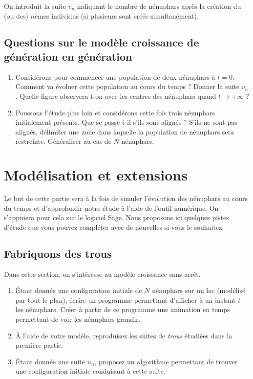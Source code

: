 \documentclass{../ficheTDTP}
\begin{document}
	On introduit la suite $v_n$ indiquant le nombre de nénuphars après la création du (ou des) $n$èmes individus (si plusieurs sont créés simultanément).\\

	\subsection{Questions sur le modèle \og croissance de génération en génération\fg}

\begin{enumerate}
	\item Considérons pour commencer une population de deux nénuphars à $t=0$. Comment va évoluer cette population au cours du temps ? Donner la suite $v_n$. Quelle figure observera-t-on avec les centres des nénuphars quand $t \rightarrow +\infty$ ?

	\item Poussons l'étude plus loin et considérons cette fois trois nénuphars initialement présents. Que se passe-t-il s'ils sont alignés ? S'ils ne sont pas alignés, délimiter une zone dans laquelle la population de nénuphars sera restreinte. Généraliser au cas de $N$ nénuphars.\\
\end{enumerate}



\section{Modélisation et extensions}

	Le but de cette partie sera à la fois de simuler l'évolution des nénuphars au cours du temps et d'approfondir notre étude à l'aide de l'outil numérique. On s'appuiera pour cela sur le logiciel Sage. Nous proposons ici quelques pistes d'étude que vous pouvez compléter avec de nouvelles si vous le souhaitez.

\subsection{Fabriquons des trous}

Dans cette section, on s'intéresse au modèle \og croissance sans arrêt\fg.

	\begin{enumerate}
		\item Étant donnée une configuration initiale de $N$ nénuphars sur un lac (modélisé par tout le plan), écrire un programme permettant d'afficher à un instant $t$ les nénuphars. Créer à partir de ce programme une animation en temps permettant de voir les nénuphars grandir.

        \item À l'aide de votre modèle, reproduisez les suites de \textit{trous} étudiées dans la première partie.

        \item Étant donnée une suite $u_n$, proposez un algorithme permettant de trouver une configuration initiale conduisant à cette suite.

	\end{enumerate}
\end{document}

